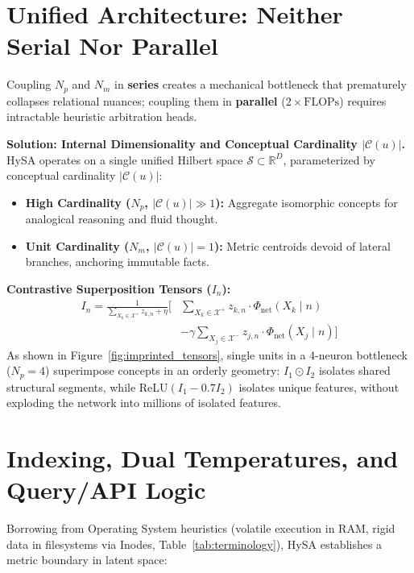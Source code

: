 \documentclass[10pt,twocolumn]{article}
\theoremstyle{definition}
\begin{document}
\section{Unified Architecture: Neither Serial Nor Parallel}
Coupling $N_p$ and $N_m$ in \textbf{series} creates a mechanical bottleneck that prematurely collapses relational nuances; coupling them in \textbf{parallel} ($2\times \mathrm{FLOPs}$) requires intractable heuristic arbitration heads.

\textbf{Solution: Internal Dimensionality and Conceptual Cardinality $|\mathcal{C}(u)|$.} HySA operates on a single unified Hilbert space $\mathcal{S} \subset \mathbb{R}^D$, parameterized by conceptual cardinality $|\mathcal{C}(u)|$:
\begin{itemize}[leftmargin=*, itemsep=1.5pt]
    \item \textbf{High Cardinality ($N_p$, $|\mathcal{C}(u)| \gg 1$):} Aggregate isomorphic concepts for analogical reasoning and fluid thought.
    \item \textbf{Unit Cardinality ($N_m$, $|\mathcal{C}(u)|=1$):} Metric centroids devoid of lateral branches, anchoring immutable facts.
\end{itemize}

\textbf{Contrastive Superposition Tensors ($I_n$):}
\begin{equation}
\begin{aligned}
    I_n = \frac{1}{\sum_{X_k \in \mathcal{X}^+} z_{k,n} + \eta} \Bigg[ & \sum_{X_k \in \mathcal{X}^+} z_{k,n} \cdot \Phi_{\mathrm{net}}(X_k \mid n) \\
    & - \gamma \sum_{X_j \in \mathcal{X}^-} z_{j,n} \cdot \Phi_{\mathrm{net}}(X_j \mid n) \Bigg]
\end{aligned}
\end{equation}
As shown in Figure~\ref{fig:imprinted_tensors}, single units in a 4-neuron bottleneck ($N_p=4$) superimpose concepts in an orderly geometry: $I_1 \odot I_2$ isolates shared structural segments, while $\mathrm{ReLU}(I_1 - 0.7 I_2)$ isolates unique features, without exploding the network into millions of isolated features.

\section{Indexing, Dual Temperatures, and Query/API Logic}
Borrowing from Operating System heuristics (volatile execution in RAM, rigid data in filesystems via Inodes, Table~\ref{tab:terminology}), HySA establishes a metric boundary in latent space:
\end{document}
